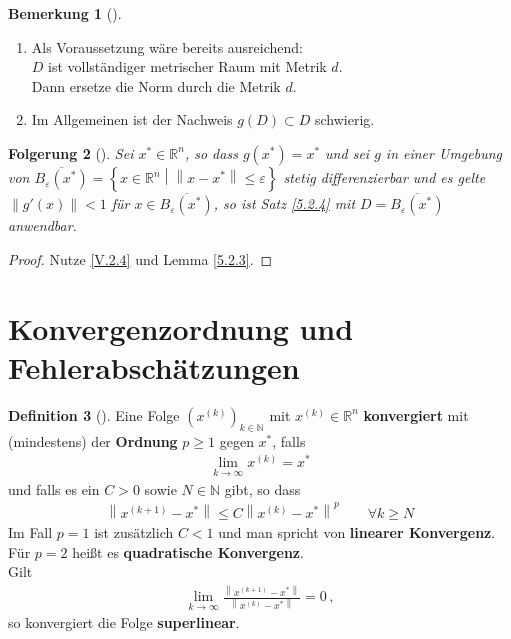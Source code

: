 \documentclass[ngerman,fontsize=11pt, paper=a4, parskip=half, titlepage=true, toc=bib]{scrbook}
\theoremstyle{definition}
\newtheorem{Def}{Definition}[section]		%
\newtheorem{Bem}[Def]{Bemerkung}	%
\theoremstyle{plain}
\newtheorem{Fol}[Def]{Folgerung}
\newcommand{\R}{\mathds{R}}
\newcommand{\N}{\mathds{N}}
\newcommand{\nn}[1]{\left\| #1 \right\|}
\newcommand{\sectione}[1]{ \setcounter{equation}{0}\section{#1}}
\newcommand{\subsectione}[1]{\addtocounter{Def}{1}\subsection{#1}}
\newenvironment{Fole}[1][]{ %
  \begin{Fol}[#1]
  }
  {
  \end{Fol}
  \addtocounter{subsection}{1}
}
\newenvironment{Beme}[1][]{ %
  \begin{Bem}[#1]
  }
  {
  \end{Bem}
  \addtocounter{subsection}{1}
}
\newenvironment{Defe}[1][]{ %
  \begin{Def}[#1]
  }
  {
  \end{Def}
  \addtocounter{subsection}{1}
}
\begin{document}
\begin{Beme}
  \label{5.2.5}~
  \begin{enumerate}[1)]
  \item Als Voraussetzung wäre bereits ausreichend:\\
    $D$ ist vollständiger metrischer Raum mit Metrik $d$. \\
    Dann ersetze die Norm durch die Metrik $d$.
  \item Im Allgemeinen ist der Nachweis $g(D)\subset D$ schwierig.
  \end{enumerate}
\end{Beme}



\begin{Fole}
  \label{5.2.6}
  Sei $x^{*}\in \R^n$, so dass $g(x^{*})=x^{*}$ und sei $g$ in einer Umgebung von 
  $\overline{B_\varepsilon(x^{*})}=\left\{ x\in \R^n \middle\vert \nn{x-x^{*}}\leq \varepsilon \right\}$
  stetig differenzierbar und es gelte $\nn{g'(x)}<1$ für $x\in \overline{B_\varepsilon(x^{*})}$,
  so ist Satz \ref{5.2.4} mit $D=\overline{B_\varepsilon(x^{*})}$ anwendbar.
\end{Fole}

\begin{proof}
  Nutze \eqref{V.2.4} und Lemma \ref{5.2.3}.
\end{proof}

\sectione{Konvergenzordnung und Fehlerabschätzungen}

\begin{Defe}
  \label{5.3.1}
  Eine Folge $(x^{(k)})_{k\in\N} $ mit $x^{(k)}\in\R^n$ \textbf{konvergiert} mit (mindestens)
  der \textbf{Ordnung} $p\geq 1$ gegen $x^{*}$, falls
  \begin{gather*}
    \lim\limits_{k\rightarrow \infty}x^{(k)}=x^{*}
  \end{gather*}
  und falls es ein $C>0$ sowie $N\in\N$ gibt, so dass
  \begin{gather*}
    \nn{x^{(k+1)}-x^{*}} \leq C \nn{x^{(k)}-x^{*}}^p\qquad \forall k\geq N 
  \end{gather*}
  Im Fall $p=1$ ist zusätzlich $C<1$ und man spricht von \textbf{linearer Konvergenz}. \\
  Für $p=2$ heißt es \textbf{quadratische Konvergenz}.
  \\Gilt 
  \begin{gather*} 
    \lim\limits_{k\rightarrow \infty}\frac{\nn{x^{(k+1)}-x^{*}}}{\nn{x^{(k)}-x^{*}}} = 0\, ,
  \end{gather*} so konvergiert die Folge \textbf{superlinear}.
\end{Defe}
\end{document}
